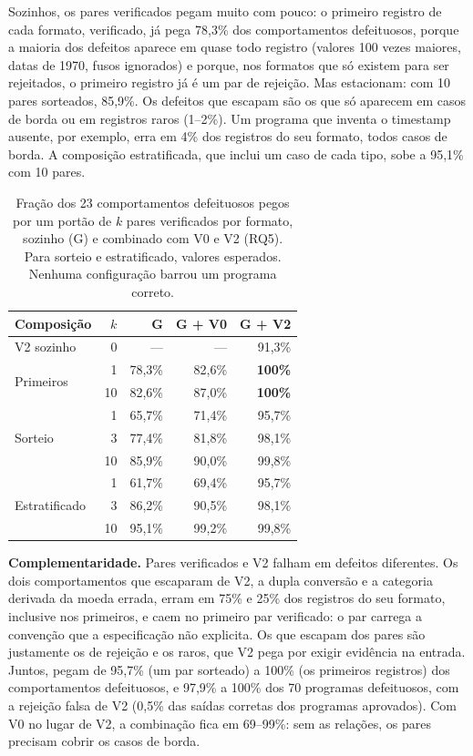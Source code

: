 \documentclass[sigconf,nonacm]{acmart}
\begin{document}
Sozinhos, os pares verificados pegam muito com pouco: o primeiro registro de cada formato, verificado, já pega 78,3\% dos comportamentos defeituosos, porque a maioria dos defeitos aparece em quase todo registro (valores 100 vezes maiores, datas de 1970, fusos ignorados) e porque, nos formatos que só existem para ser rejeitados, o primeiro registro já é um par de rejeição. Mas estacionam: com 10 pares sorteados, 85,9\%. Os defeitos que escapam são os que só aparecem em casos de borda ou em registros raros (1--2\%). Um programa que inventa o timestamp ausente, por exemplo, erra em 4\% dos registros do seu formato, todos casos de borda. A composição estratificada, que inclui um caso de cada tipo, sobe a 95,1\% com 10 pares.

\begin{table}[t]
\caption{Fração dos 23 comportamentos defeituosos pegos por um portão de $k$ pares verificados por formato, sozinho (G) e combinado com V0 e V2 (RQ5). Para sorteio e estratificado, valores esperados. Nenhuma configuração barrou um programa correto.}
\label{tab:rq5}
\small
\begin{tabular}{lrrrr}
\toprule
Composição & $k$ & G & G + V0 & G + V2 \\
\midrule
V2 sozinho & 0 & --- & --- & 91,3\% \\
\midrule
\multirow{2}{*}{Primeiros} & 1 & 78,3\% & 82,6\% & \textbf{100\%} \\
 & 10 & 82,6\% & 87,0\% & \textbf{100\%} \\
\midrule
\multirow{3}{*}{Sorteio} & 1 & 65,7\% & 71,4\% & 95,7\% \\
 & 3 & 77,4\% & 81,8\% & 98,1\% \\
 & 10 & 85,9\% & 90,0\% & 99,8\% \\
\midrule
\multirow{3}{*}{Estratificado} & 1 & 61,7\% & 69,4\% & 95,7\% \\
 & 3 & 86,2\% & 90,5\% & 98,1\% \\
 & 10 & 95,1\% & 99,2\% & 99,8\% \\
\bottomrule
\end{tabular}
\end{table}

\textbf{Complementaridade.} Pares verificados e V2 falham em defeitos diferentes. Os dois comportamentos que escaparam de V2, a dupla conversão e a categoria derivada da moeda errada, erram em 75\% e 25\% dos registros do seu formato, inclusive nos primeiros, e caem no primeiro par verificado: o par carrega a convenção que a especificação não explicita. Os que escapam dos pares são justamente os de rejeição e os raros, que V2 pega por exigir evidência na entrada. Juntos, pegam de 95,7\% (um par sorteado) a 100\% (os primeiros registros) dos comportamentos defeituosos, e 97,9\% a 100\% dos 70 programas defeituosos, com a rejeição falsa de V2 (0,5\% das saídas corretas dos programas aprovados). Com V0 no lugar de V2, a combinação fica em 69--99\%: sem as relações, os pares precisam cobrir os casos de borda.
\end{document}

